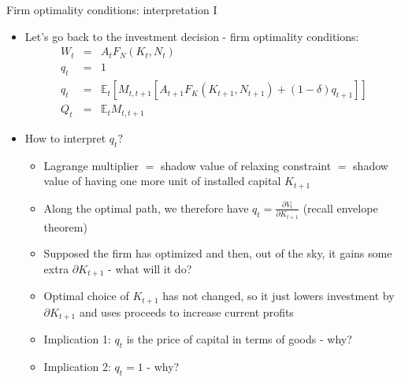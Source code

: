 \documentclass[9pt,xcolor={dvipsnames}]{beamer}
\newcommand{\bit}{\begin{itemize}}
\newcommand{\eit}{\end{itemize}}
\newcommand{\bc}{\color{blue}}
\begin{document}
\begin{frame}{Firm optimality conditions: interpretation I}

\bit
\setlength\itemsep{1.5em} 

\item Let's go back to the investment decision - firm optimality conditions:
\begin{eqnarray}
W_t &=& A_t F_N(K_t, N_t) \nonumber \\
q_t &=& 1 \nonumber \\
q_t &=&  \mathbb E_t \left[M_{t,t+1}\left[A_{t+1}F_K(K_{t+1}, N_{t+1}) + (1-\delta)q_{t+1} \right] \right] \nonumber \\
Q_t &=& \mathbb E_t M_{t,t+1} \nonumber
\end{eqnarray}

\item How to interpret $q_t?$
\bit
\setlength\itemsep{0.5em} 
	\item Lagrange multiplier $=$ shadow value of relaxing constraint $=$ shadow value of having one more unit of installed capital $K_{t+1}$

	\item Along the optimal path, we therefore have $q_t = \frac{\partial V_t}{\partial K_{t+1}}$ (recall {\bc envelope theorem})
	
	\item Supposed the firm has optimized and then, out of the sky, it gains some extra $\partial K_{t+1}$ - what will it do?
	
	\item Optimal choice of $K_{t+1}$ has not changed, so it just lowers investment by $\partial K_{t+1}$ and uses proceeds to increase current profits 
	
	\item Implication 1:  $q_t$ is the price of capital in terms of goods - why?
	
	\item Implication 2:  $q_t=1$ - why?
	
	
\eit

\eit

\end{frame}
\end{document}

